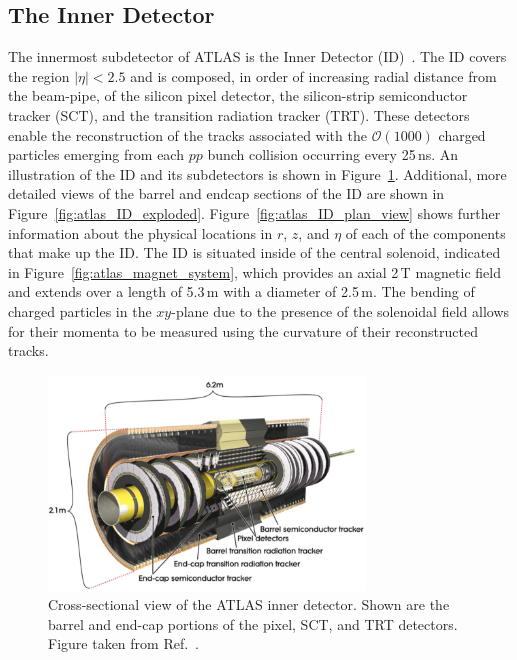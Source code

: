 \subsection{The Inner Detector}
\label{sec:inner_detector}

The innermost subdetector of ATLAS is the Inner Detector (ID)~\cite{Haywood:331064}.
The ID covers the region $\lvert \eta \rvert < 2.5$ and is composed, in order
of increasing radial distance from the beam-pipe, of the silicon pixel detector,
the silicon-strip semiconductor tracker (SCT), and the transition radiation tracker (TRT).
These detectors enable the reconstruction of the tracks associated with
the $\mathcal{O}(1000)$ charged particles emerging from each $pp$ bunch collision occurring
every 25\,ns.
An illustration of the ID and its subdetectors is shown in Figure~\ref{fig:atlas_inner_detector}.
Additional, more detailed views of the barrel and endcap sections of the ID are shown in Figure~\ref{fig:atlas_ID_exploded}.
Figure~\ref{fig:atlas_ID_plan_view} shows further information about the physical locations in $r$, $z$, and $\eta$
of each of the components that make up the ID.
The ID is situated inside of the central solenoid, indicated in Figure~\ref{fig:atlas_magnet_system},
which provides an axial 2\,T magnetic field and extends over a length of 5.3\,m with a diameter of 2.5\,m.
The bending of charged particles in the $xy$-plane due to the presence of the solenoidal
field allows for their momenta to be measured using the curvature of their reconstructed tracks.

\begin{figure}[!htb]
    \begin{center}
        \includegraphics[width=0.75\textwidth]{figures/chapter2/inner_detector/atlas_inner_detector}
        \caption{
            Cross-sectional view of the ATLAS inner detector. Shown are the barrel
            and end-cap portions of the pixel, SCT, and TRT detectors.
            Figure taken from Ref.~\cite{ATLASCollab}.
        }
        \label{fig:atlas_inner_detector}
    \end{center}
\end{figure}

